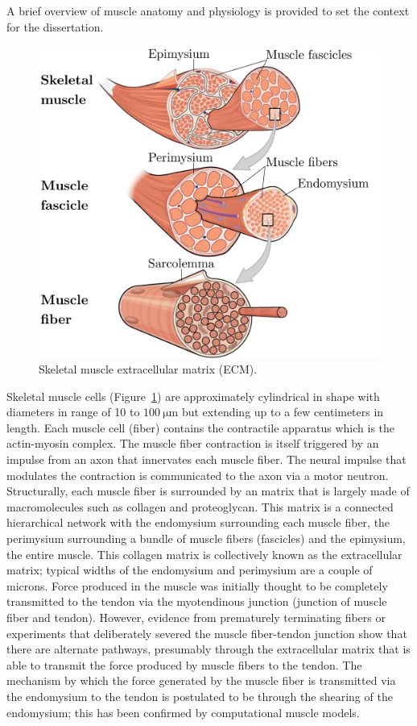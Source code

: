 A brief overview of muscle anatomy and physiology is provided to set the context for the dissertation. 
\begin{figure}[!ht]
\centering
\includegraphics[scale=.4]{Figures/FIBER.pdf}
\caption[Skeletal muscle extracellular matrix]{Skeletal muscle extracellular matrix (ECM).}
\label{fig: ECM}
\end{figure}
Skeletal muscle cells (Figure~\ref{fig: ECM}) are approximately cylindrical in shape with diameters in range of 10 to $\SI{100}{\micro\meter}$ but extending up to a few centimeters in length. 
Each muscle cell (fiber) contains the contractile apparatus which is the actin-myosin complex. 
The muscle fiber contraction is itself triggered by an impulse from an axon that innervates each muscle fiber. 
The neural impulse that modulates the contraction is communicated to the axon via a motor neutron. 
Structurally, each muscle fiber is surrounded by an matrix that is largely made of macromolecules such as collagen and proteoglycan. 
This matrix is a connected hierarchical network with the endomysium surrounding each muscle fiber, the perimysium surrounding a bundle of muscle fibers (fascicles) and the epimysium, the entire muscle. 
This collagen matrix is collectively known as the extracellular matrix; typical widths of the endomysium and perimysium are a couple of microns. 
Force produced in the muscle was initially thought to be completely transmitted to the tendon via the myotendinous junction (junction of muscle fiber and tendon). 
However, evidence from prematurely terminating fibers or experiments that deliberately severed the muscle fiber-tendon junction show that there are alternate pathways, presumably through the extracellular matrix that is able to transmit the force produced by muscle fibers to the tendon. 
The mechanism by which the force generated by the muscle fiber is transmitted via the endomysium to the tendon is postulated to be through the shearing of the endomysium; this has been confirmed by computational muscle models. 

